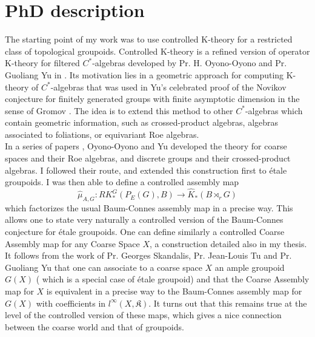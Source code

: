 \section{PhD description}

The starting point of my work was to use controlled K-theory for a restricted class of topological groupoids. Controlled K-theory is a refined version of operator K-theory for filtered $C^*$-algebras developed by Pr. H. Oyono-Oyono and Pr. Guoliang Yu in \cite{OY2}. Its motivation lies in a geometric approach for computing K-theory of $C^*$-algebras that was used in Yu’s celebrated  proof of the Novikov conjecture for finitely generated groups with finite asymptotic dimension in the sense of Gromov \cite{Yu1}. The idea is to extend this method to other $C^*$-algebras which contain geometric information, such as crossed-product algebras, algebras associated to foliations, or equivariant Roe algebras.\\

In a series of papers \cite{OY1}\cite{OY2}\cite{OY3}, Oyono-Oyono and Yu developed the theory for coarse spaces and their Roe algebras, and discrete groups and their crossed-product algebras. I followed their route, and extended this construction first to étale groupoids. I was then able to define a controlled assembly map \[\hat\mu_{A,G} : RK_*^G(P_E(G),B)\rightarrow \hat K_*(B\rtimes_r G)\] which factorizes the usual Baum-Connes assembly map in a precise way. This allows one to state very naturally a controlled version of the Baum-Connes conjecture for étale groupoids. One can define similarly a controlled Coarse Assembly map for any Coarse Space $X$, a construction detailed also in my thesis. It follows from the work of Pr. Georges Skandalis, Pr. Jean-Louis Tu and Pr. Guoliang Yu \cite{SkTuYu} that one can associate to a coarse space $X$ an ample groupoid $G(X)$ ( which is a special case of étale groupoid) and that the Coarse Assembly map for $X$ is equivalent in a precise way to the Baum-Connes assembly map for $G(X)$ with coefficients in $l^\infty(X,\mathfrak K)$. It turns out that this remains true at the level of the controlled version of these maps, which gives a nice connection between the coarse world and that of groupoids. \\

